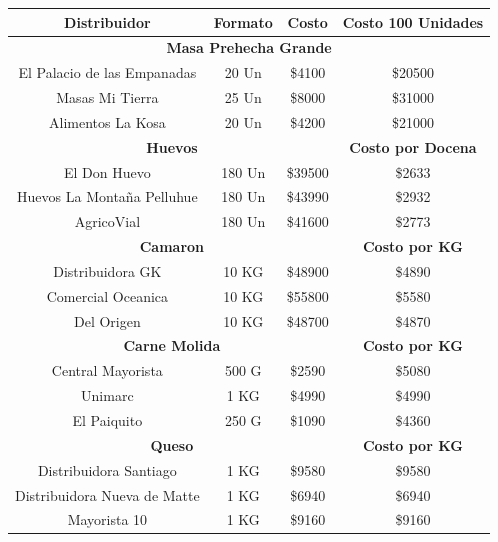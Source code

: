 \documentclass[12pt]{article}
\begin{document}
\begin{table}[h!]
    \centering
    \begin{tabular}{|| c | c | c | c||} 
        \hline
    \textbf{Distribuidor} & Formato & \textbf{Costo} & \textbf{Costo 100 Unidades} \\ [0.5ex]
        \hline\hline
        \multicolumn{4}{||c||}{\textbf{Masa Prehecha Grande}} \\ [0.5ex] \hline \hline
        El Palacio de las Empanadas & 20 Un & \$4100 & \$20500 \\ \hline
        Masas Mi Tierra & 25 Un & \$8000 & \$31000 \\ \hline
        Alimentos La Kosa & 20 Un & \$4200 & \$21000 \\ [1ex] \hline \hline

        \multicolumn{3}{||c||}{\textbf{Huevos}} & \textbf{Costo por Docena} \\ [0.5ex] \hline \hline
        El Don Huevo & 180 Un & \$39500 & \$2633 \\ \hline
        Huevos La Montaña Pelluhue & 180 Un & \$43990 & \$2932 \\ \hline
        AgricoVial & 180 Un & \$41600 & \$2773 \\ [1ex] \hline \hline

        \multicolumn{3}{||c|}{\textbf{Camaron}} & \textbf{Costo por KG} \\ [0.5ex] \hline \hline
        Distribuidora GK & 10 KG & \$48900 & \$4890 \\ \hline
        Comercial Oceanica & 10 KG & \$55800 & \$5580 \\ \hline
        Del Origen & 10 KG & \$48700 & \$4870 \\ [1ex] \hline \hline

        \multicolumn{3}{||c|}{\textbf{Carne Molida}} & \textbf{Costo por KG} \\ [0.5ex] \hline \hline %
        Central Mayorista & 500 G & \$2590 & \$5080 \\ \hline 
        Unimarc & 1 KG & \$4990 & \$4990 \\ \hline 
        El Paiquito & 250 G & \$1090 & \$4360 \\ [1ex] \hline \hline


        \multicolumn{3}{||c|}{\textbf{Queso}} & \textbf{Costo por KG} \\ [0.5ex] \hline \hline %
        Distribuidora Santiago & 1 KG & \$9580 & \$9580 \\ \hline
        Distribuidora Nueva de Matte & 1 KG & \$6940 & \$6940 \\ \hline
        Mayorista 10 & 1 KG & \$9160 & \$9160 \\ [1ex] \hline \hline


\end{tabular}
\end{table}
\end{document}
